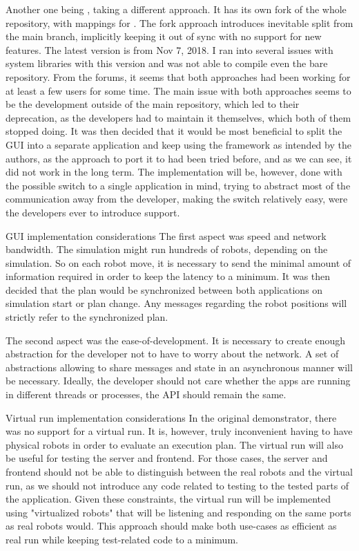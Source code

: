 Another one being {\ofnode}, taking a different approach. It has its own fork of the whole {\of} repository, with mappings for {\cmake}. The fork approach introduces inevitable split from the main branch, implicitly keeping it out of sync with no support for new features. \br
The latest version is from Nov 7, 2018. I ran into several issues with system libraries with this version and was not able to compile even the bare repository.\br\br
From the forums, it seems that both approaches had been working for at least a few users for some time. The main issue with both approaches seems to be the development outside of the main repository, which led to their deprecation, as the developers had to maintain it themselves, which both of them stopped doing.
It was then decided that it would be most beneficial to split the GUI into a separate application and keep using the framework as intended by the authors, as the approach to port it to {\cmake} had been tried before, and as we can see, it did not work in the long term.\br\br
The implementation will be, however, done with the possible switch to a single application in mind, trying to abstract most of the communication away from the developer, making the switch relatively easy, were the developers ever to introduce {\cmake} support.

\sec GUI implementation considerations
The first aspect was speed and network bandwidth. The simulation might run hundreds of robots, depending on the simulation. So on each robot move, it is necessary to send the minimal amount of information required in order to keep the latency to a minimum. 
It was then decided that the plan would be synchronized between both applications on simulation start or plan change. Any messages regarding the robot positions will strictly refer to the synchronized plan.

The second aspect was the ease-of-development. It is necessary to create enough abstraction for the developer not to have to worry about the network. A set of abstractions allowing to share messages and state in an asynchronous manner will be necessary. Ideally, the developer should not care whether the apps are running in different threads or processes, the API should remain the same.

\sec Virtual run implementation considerations
In the original demonstrator, there was no support for a virtual run. It is, however, truly inconvenient having to have physical robots in order to evaluate an execution plan. The virtual run will also be useful for testing the server and frontend. For those cases, the server and frontend should not be able to distinguish between the real robots and the virtual run, as we should not introduce any code related to testing to the tested parts of the application. Given these constraints, the virtual run will be implemented using "virtualized robots" that will be listening and responding on the same ports as real robots would. This approach should make both use-cases as efficient as real run while keeping test-related code to a minimum.

